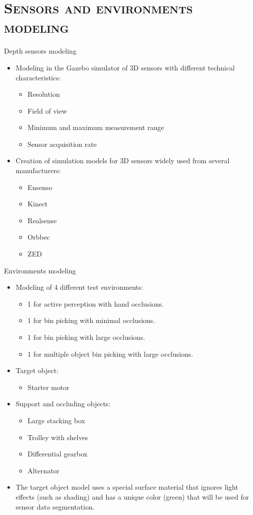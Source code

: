 \section{\scshape Sensors and environments modeling}

\begin{frame}{Depth sensors modeling}
	\begin{itemize}
		\item Modeling in the Gazebo simulator of 3D sensors with different technical characteristics:
		\begin{itemize}
			\item Resolution
			\item Field of view
			\item Minimum and maximum measurement range
			\item Sensor acquisition rate
		\end{itemize}
		\item Creation of simulation models for 3D sensors widely used from several manufacturers:
		\begin{itemize}
			\item Ensenso
			\item Kinect
			\item Realsense
			\item Orbbec
			\item ZED
		\end{itemize}
	\end{itemize}
\end{frame}


\begin{frame}{Environments modeling}
	\begin{itemize}
		\item Modeling of 4 different test environments:
		\begin{itemize}
			\item 1 for active perception with hand occlusions.
			\item 1 for bin picking with minimal occlusions.
			\item 1 for bin picking with large occlusions.
			\item 1 for multiple object bin picking with large occlusions.
		\end{itemize}
		\item Target object:
		\begin{itemize}
			\item Starter motor
		\end{itemize}
		\item Support and occluding objects:
		\begin{itemize}
			\item Large stacking box
			\item Trolley with shelves
			\item Differential gearbox
			\item Alternator
		\end{itemize}
		\item The target object model uses a special surface material that ignores light effects (such as shading) and has a unique color (green) that will be used for sensor data segmentation.
	\end{itemize}
\end{frame}


